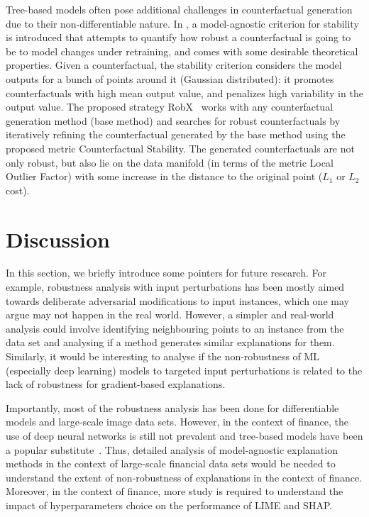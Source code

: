 \documentclass[sigconf]{acmart}
\begin{document}
Tree-based models often pose additional challenges in counterfactual generation due to their non-differentiable nature. In \cite{dutta2022robust}, a model-agnostic criterion for stability is introduced that attempts to quantify how robust a counterfactual is going to be to model changes under retraining, and comes with some desirable theoretical properties.  Given a counterfactual, the stability criterion considers the model outputs for a bunch of points around it (Gaussian distributed): it promotes counterfactuals with high mean output value, and penalizes high variability in the output value. The proposed strategy RobX~\cite{dutta2022robust} works with any counterfactual generation
method (base method) and searches for robust
counterfactuals by iteratively refining the counterfactual generated by the base method using the proposed metric Counterfactual Stability. The generated counterfactuals are not only robust, but also lie on the data manifold (in terms of the metric Local Outlier Factor) with some increase in the distance to the original point ($L_1$ or $L_2$ cost).




\section{Discussion}

In this section, we briefly introduce some pointers for future research. For example, robustness analysis with input perturbations has been mostly aimed towards deliberate adversarial modifications to input instances, which one may argue may not happen in the real world. However, a simpler and real-world analysis could involve identifying neighbouring points to an instance from the data set and analysing if a method generates similar explanations for them. Similarly, it would be interesting to analyse if the non-robustness of ML (especially deep learning) models to targeted input perturbations is related to the lack of robustness for gradient-based explanations.

Importantly, most of the robustness analysis has been done for differentiable models and large-scale image data sets. However, in the context of finance, the use of deep neural networks is still not prevalent and tree-based models have been a popular substitute~\cite{Bracke_boe_2019}. Thus, detailed analysis of model-agnostic explanation methods in the context of large-scale financial data sets would be needed to understand the extent of non-robustness of explanations in the context of finance. Moreover, in the context of finance, more study is required to understand the impact of hyperparameters choice on the performance of LIME and SHAP.
\end{document}

